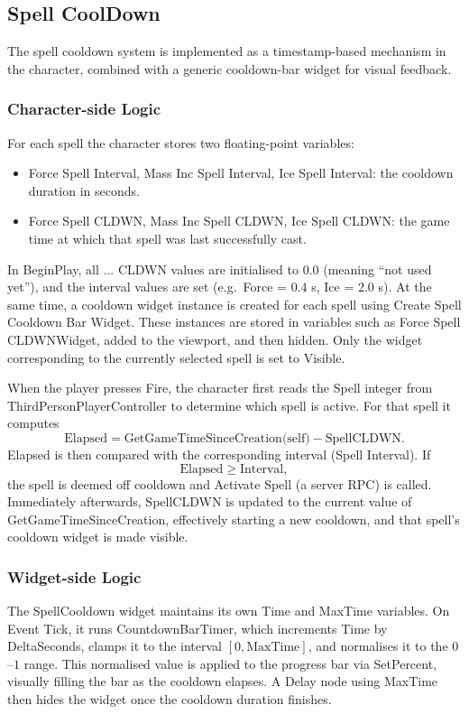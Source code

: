 \documentclass[conference]{IEEEtran}
\begin{document}
    \subsection{Spell CoolDown}
    The spell cooldown system is implemented as a timestamp-based mechanism in the
    character, combined with a generic cooldown-bar widget for visual feedback.

    \subsubsection*{Character-side Logic}
    \vspace{5pt}
    

    For each spell the character stores two floating-point variables:
    \begin{itemize}
        \item Force Spell Interval, Mass Inc Spell Interval,
            Ice Spell Interval: the cooldown duration in seconds.
        \item Force Spell CLDWN, Mass Inc Spell CLDWN,
            Ice Spell CLDWN: the game time at which that spell was last
            successfully cast.
    \end{itemize}

    In BeginPlay, all ... CLDWN values are initialised to 0.0 (meaning
    ``not used yet''), and the interval values are set (e.g.\ Force = 0.4 s,
    Ice = 2.0 s). At the same time, a cooldown widget instance is created for each
    spell using Create Spell Cooldown Bar Widget. These instances are stored in
    variables such as Force Spell CLDWNWidget, added to the viewport, and then
    hidden. Only the widget corresponding to the currently selected spell is set
    to Visible.

    When the player presses Fire, the character first reads the Spell integer from
    ThirdPersonPlayerController to determine which spell is active. For that spell
    it computes
    \[
    \text{Elapsed} =
    \text{GetGameTimeSinceCreation(self)} - \text{SpellCLDWN}.
    \]
    Elapsed is then compared with the corresponding interval (Spell Interval). If
    \[
    \text{Elapsed} \ge \text{Interval},
    \]
    the spell is deemed off cooldown and Activate Spell (a server RPC) is called.
    Immediately afterwards, SpellCLDWN is updated to the current value of
    GetGameTimeSinceCreation, effectively starting a new cooldown, and that
    spell’s cooldown widget is made visible.

    \subsubsection*{Widget-side Logic}
    \vspace{5pt}
    The SpellCooldown widget maintains its own Time and MaxTime variables. On
    Event Tick, it runs CountdownBarTimer, which increments Time by DeltaSeconds,
    clamps it to the interval $[0, \text{MaxTime}]$, and normalises it to the
    $0$--$1$ range. This normalised value is applied to the progress bar via
    SetPercent, visually filling the bar as the cooldown elapses. A Delay node
    using MaxTime then hides the widget once the cooldown duration finishes.
\end{document}
